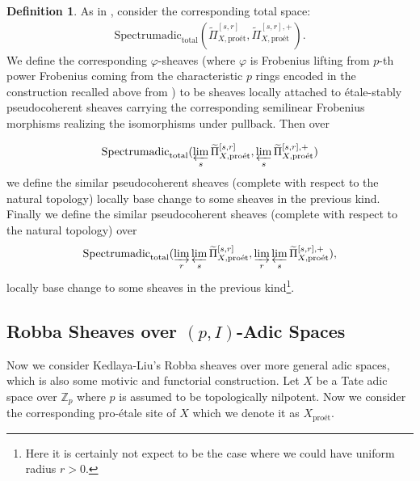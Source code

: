 \documentclass[11pt]{book}
\theoremstyle{definition}
\newtheorem{definition}[theorem]{Definition}
\numberwithin{equation}{section}
\begin{document}
\begin{definition}
As in \cite[Chapter 4.3 and Chapter 8]{12KL2}, consider the corresponding total space:
\begin{align}
\mathrm{Spectrumadic}_{\mathrm{total}}(\widetilde{\Pi}^{[s,r]}_{X,\text{pro\'et}},\widetilde{\Pi}^{[s,r],+}_{X,\text{pro\'et}}).	
\end{align}
We define the corresponding $\varphi$-sheaves (where $\varphi$ is Frobenius lifting from $p$-th power Frobenius coming from the characteristic $p$ rings encoded in the construction recalled above from \cite{12KL2}) to be sheaves locally attached to \'etale-stably pseudocoherent sheaves carrying the corresponding semilinear Frobenius morphisms realizing the isomorphisms under pullback. Then over 

\begin{align}
\mathrm{Spectrumadic}_{\mathrm{total}}(\varprojlim_s \widetilde{\Pi}^{[s,r]}_{X,\text{pro\'et}},\varprojlim_s \widetilde{\Pi}^{[s,r],+}_{X,\text{pro\'et}})	
\end{align}
we define the similar pseudocoherent sheaves (complete with respect to the natural topology) locally base change to some sheaves in the previous kind. Finally we define the similar pseudocoherent sheaves (complete with respect to the natural topology) over 
\begin{align}
\mathrm{Spectrumadic}_{\mathrm{total}}(\varinjlim_r \varprojlim_s \widetilde{\Pi}^{[s,r]}_{X,\text{pro\'et}},\varinjlim_r \varprojlim_s \widetilde{\Pi}^{[s,r],+}_{X,\text{pro\'et}}),
\end{align}
locally base change to some sheaves in the previous kind\footnote{Here it is certainly not expect to be the case where we could have uniform radius $r>0$.}.

\end{definition}













\newpage
\subsection{Robba Sheaves over $(p,I)$-Adic Spaces}

\indent Now we consider Kedlaya-Liu's Robba sheaves over more general adic spaces, which is also some motivic and functorial construction. Let $X$ be a Tate adic space over $\mathbb{Z}_p$ where $p$ is assumed to be topologically nilpotent. Now we consider the corresponding pro-\'etale site of $X$ which we denote it as $X_\text{pro\'et}$.
\end{document}
